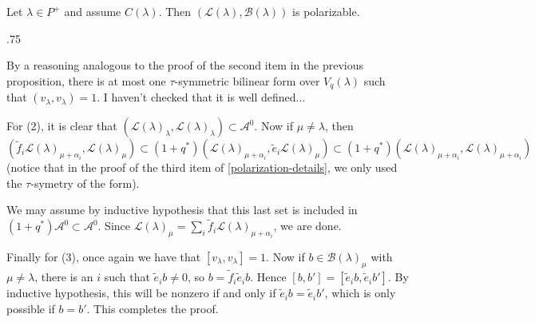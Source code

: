 \documentclass[11pt,fleqn]{article}
\makeatletter
\renewenvironment{proof}[1][\proofname]{\par
  \pushQED{\qed}%
  \normalfont \topsep.75\paraskip\relax
  \trivlist
  \item[\hskip\labelsep
        \itshape
    #1\@addpunct{.}]\ignorespaces
}{%
  \popQED\endtrivlist\@endpefalse
}
\newcommand\A{\mathcal A}
\newcommand\B{\mathcal B}
\renewcommand\L{\mathcal L}
\makeatother
\begin{document}
\begin{Lemma}
	Let $\lambda \in P^+$ and assume $C(\lambda)$. Then $(\L(\lambda), \B(\lambda))$
is polarizable.
\end{Lemma}
\begin{proof}
	By a reasoning analogous to the proof of the second item in the previous
proposition, there is at most one $\tau$-symmetric bilinear form over $V_q(\lambda)$ such
that $(v_\lambda,v_\lambda) = 1$. I haven't checked that it is well defined...

	For (2), it is clear that $(\L(\lambda)_\lambda,\L(\lambda)_\lambda) \subset \A^0$.
Now if $\mu \neq \lambda$, then
$$ (\tilde f_i \L(\lambda)_{\mu + \alpha_i}, \L(\lambda)_\mu) \subset (1+q^*)(\L(\lambda)_
{\mu + \alpha_i},\tilde e_i \L(\lambda)_\mu) \subset (1+q^*)(\L(\lambda)_{\mu + \alpha_i},
\L(\lambda)_{\mu + \alpha_i}) $$
(notice that in the proof of the third item of \ref{polarization-details}, we only used
the $\tau$-symetry of the form).

We may assume by inductive hypothesis that this last set is included in $(1+q^*) \A^0 \subset 
\A^0$. Since $\L(\lambda)_\mu = \sum_i \tilde f_i \L(\lambda)_{\mu + \alpha_i}$, we are done.

	Finally for (3), once again we have that $[v_\lambda, v_\lambda] = 1$. Now if $b
\in \B(\lambda)_\mu$ with $\mu \neq \lambda$, there is an $i$ such that $\tilde e_i b \neq
0$, so $b = \tilde f_i \tilde e_i b$. Hence $[b,b'] = [\tilde e_i b, \tilde e_i b']$. By
inductive hypothesis, this will be nonzero if and only if $\tilde e_i b = \tilde e_i b'$,
which is only possible if $b = b'$. This completes the proof.
\end{proof}
\end{document}
